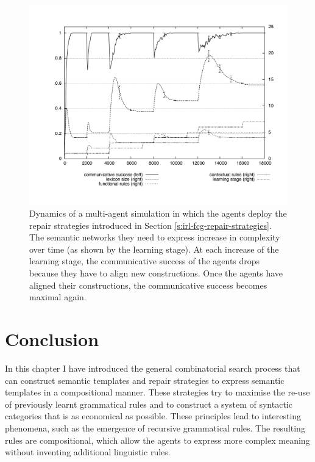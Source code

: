 \begin{figure}[htbp]
  \begin{center}
    \includegraphics[width=\textwidth]{./composition/figures/learning-operators-graph.pdf}
    \caption[Resulting dynamics of repair strategies for predefined
    conceptualisations]{Dynamics of a multi-agent simulation in which
      the agents deploy the repair strategies introduced in Section
      \ref{s:irl-fcg-repair-strategies}. The semantic networks they
      need to express increase in complexity over time (as shown by
      the learning stage). At each increase of the learning stage, the
      communicative success of the agents drops because they have to
      align new constructions. Once the agents have aligned their
      constructions, the communicative success becomes maximal again.}
    \label{f:map-repair-strategies-graph}
  \end{center}
\end{figure}

\section{Conclusion}

In this chapter I have introduced the general combinatorial search
process that can construct semantic templates and repair strategies to
express semantic templates in a compositional manner. These strategies
try to maximise the re-use of previously learnt grammatical rules and
to construct a system of syntactic categories that is as economical as
possible. These principles lead to interesting phenomena, such as the
emergence of recursive grammatical rules. The resulting rules are
compositional, which allow the agents to express more complex meaning
without inventing additional linguistic rules.

\newpage
\thispagestyle{empty}
